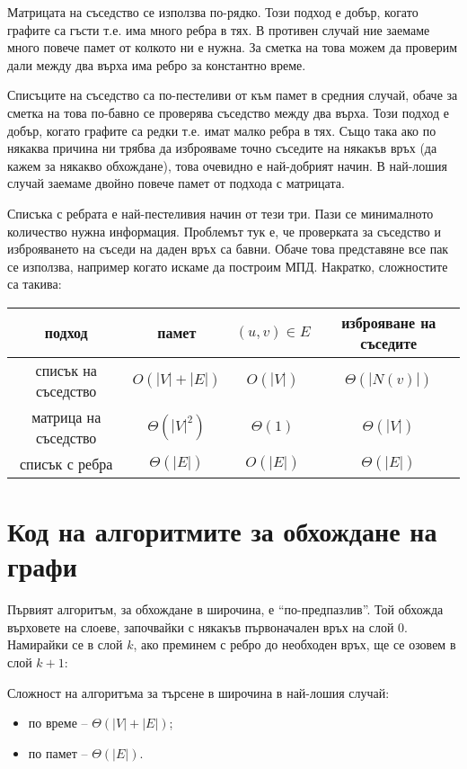 Матрицата на съседство се използва по-рядко.
Този подход е добър, когато графите са гъсти т.е. има много ребра в тях.
В противен случай ние заемаме много повече памет от колкото ни е нужна.
За сметка на това можем да проверим дали между два върха има ребро за константно време.

Списъците на съседство са по-пестеливи от към памет в средния случай, обаче за сметка на това по-бавно се проверява съседство между два върха.
Този подход е добър, когато графите са редки т.е. имат малко ребра в тях.
Също така ако по някаква причина ни трябва да изброяваме точно съседите на някакъв връх (да кажем за някакво обхождане), това очевидно е най-добрият начин.
В най-лошия случай заемаме двойно повече памет от подхода с матрицата.

Списъка с ребрата е най-пестеливия начин от тези три.
Пази се минималното количество нужна информация.
Проблемът тук е, че проверката за съседство и изброяването на съседи на даден връх са бавни.
Обаче това представяне все пак се използва, например когато искаме да построим МПД.
Накратко, сложностите са такива:
\begin{center}
    \begin{tabular}{|c|c|c|c|}
        \hline
        подход               & памет           & $(u, v) \in E$ & изброяване на съседите \\
        \hline
        списък на съседство  & $O(|V| + |E|)$  & $O(|V|)$       & $\Theta(|N(v)|)$       \\
        \hline
        матрица на съседство & $\Theta(|V|^2)$ & $\Theta(1)$    & $\Theta(|V|)$          \\
        \hline
        списък с ребра       & $\Theta(|E|)$   & $O(|E|)$       & $\Theta(|E|)$          \\
        \hline
    \end{tabular}
\end{center}

\section{Код на алгоритмите за обхождане на графи}

Първият алгоритъм, за обхождане в широчина, е ``по-предпазлив''.
Той обхожда върховете на слоеве, започвайки с някакъв първоначален връх на слой $0$.
Намирайки се в слой $k$, ако преминем с ребро до необходен връх, ще се озовем в слой $k + 1$:


Сложност на алгоритъма за търсене в широчина в най-лошия случай:
\begin{itemize}
    \item по време -- $\Theta(|V| + |E|)$;
    \item по памет -- $\Theta(|E|)$.
\end{itemize}

